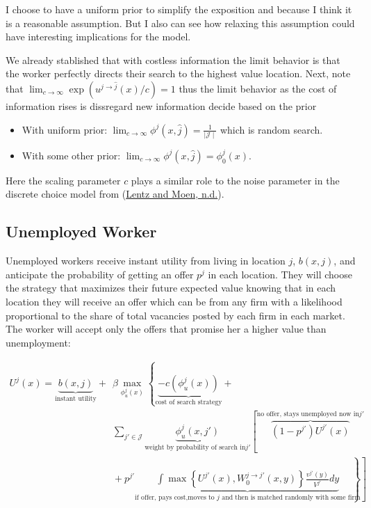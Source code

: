 \documentclass[
  letterpaper,
  DIV=11,
  numbers=noendperiod]{scrreprt}
\providecommand{\tightlist}{%
  \setlength{\itemsep}{0pt}\setlength{\parskip}{0pt}}\usepackage{longtable,booktabs,array}
\begin{document}
I choose to have a uniform prior to simplify the exposition and because
I think it is a reasonable assumption. But I also can see how relaxing
this assumption could have interesting implications for the model.

We already stablished that with costless information the limit behavior
is that the worker perfectly directs their search to the highest value
location. Next, note that
\(\lim_{c \to \infty} \exp(u^{j\to \hat{j}}(x) / c) = 1\) thus the limit
behavior as the cost of information rises is dissregard new information
decide based on the prior

\begin{itemize}
\tightlist
\item
  With uniform prior:
  \(\lim_{c \to \infty} \phi^j(x,\hat{j}) = \frac{1}{\mid \mathcal{J} \mid}\)
  which is random search.
\item
  With some other prior:
  \(\lim_{c \to \infty} \phi^j(x,\hat{j}) = \phi^j_0(x)\).
\end{itemize}

Here the scaling parameter \(c\) plays a similar role to the noise
parameter in the discrete choice model from
(\protect\hyperlink{ref-lentzCompetitiveRandomSearch}{Lentz and Moen,
n.d.}).

\hypertarget{unemployed-worker}{%
\subsection{Unemployed Worker}\label{unemployed-worker}}

Unemployed workers receive instant utility from living in location
\(j\), \(b(x,j)\), and anticipate the probability of getting an offer
\(p^j\) in each location. They will choose the strategy that maximizes
their future expected value knowing that in each location they will
receive an offer which can be from any firm with a likelihood
proportional to the share of total vacancies posted by each firm in each
market. The worker will accept only the offers that promise her a higher
value than unemployment:

\begin{align*}
U^{j}(x) = \underbrace{b(x,j)}_{\text{instant utility}} + &\beta\max_{\phi^j_u(x)}\left\{ \underbrace{-c(\phi^j_u(x))}_{\text{cost of search strategy}} \right.  + \\
& \sum_{j'\in \mathcal{J}} \underbrace{\phi^j_u(x, j')}_{\text{weight by probability of search in} j'}\left[ \overbrace{(1-p^{j'})U^{j'}(x)}^{\text{no offer, stays unemployed now in} j'} \right.  \\
& \left. \left. \hspace{0cm} + p^{j'} \underbrace{\int \max\left\{U^{j'}(x),W^{j\to j'}_{0}(x,y)\right\}\frac{v^{j'}(y)}{V^{j'}}dy}_{\text{if offer, pays cost,moves to } j \text{ and then is matched randomly with some firm}} \right] \right\} 
\end{align*}
\end{document}
